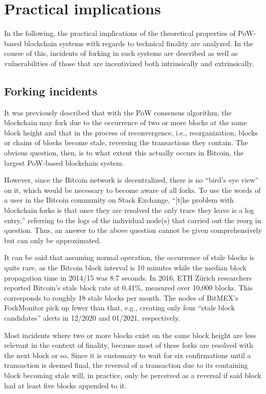 \section{Practical implications}

In the following, the practical implications of the theoretical properties of PoW-based blockchain systems with regards to technical finality are analyzed.
In the course of this, incidents of forking in such systems are described as well as vulnerabilities of those that are incentivized both intrinsically and extrinsically.

\subsection{Forking incidents}

It was previously described that with the PoW consensus algorithm, the blockchain may fork due to the occurrence of two or more blocks at the same block height and that in the process of reconvergence, i.e., reorganization, blocks or chains of blocks become stale, reversing the transactions they contain.
The obvious question, then, is to what extent this actually occurs in Bitcoin, the largest PoW-based blockchain system.

However, since the Bitcoin network is decentralized, there is no ``bird's eye view'' on it, which would be necessary to become aware of all forks.
To use the words of a user in the Bitcoin community on Stack Exchange, ``[t]he problem with blockchain forks is that once they are resolved the only trace they leave is a log entry,'' \autocite{stackexchange2017bitcoinforks} referring to the logs of the individual node(s) that carried out the reorg in question.
Thus, an answer to the above question cannot be given comprehensively but can only be approximated.

It can be said that assuming normal operation, the occurrence of stale blocks is quite rare, as the Bitcoin block interval is 10 minutes while the median block propagation time in 2014/15 was 8.7 seconds. \autocite[111]{croman2016}
In 2016, ETH Zürich researchers reported Bitcoin's stale block rate at 0.41\%, measured over 10,000 blocks. \autocite[3]{gervais2016}
This corresponds to roughly 18 stale blocks per month.
The nodes of BitMEX's ForkMonitor pick up fewer than that, e.g., creating only four ``stale block candidates'' alerts in 12/2020 and 01/2021, respectively. \autocite{forkmonitor2021staleblocks}

Most incidents where two or more blocks exist on the same block height are less relevant in the context of finality, because most of these forks are resolved with the next block or so.
Since it is customary to wait for six confirmations until a transaction is deemed final, the reversal of a transaction due to its containing block becoming stale will, in practice, only be perceived as a reversal if said block had at least five blocks appended to it.

